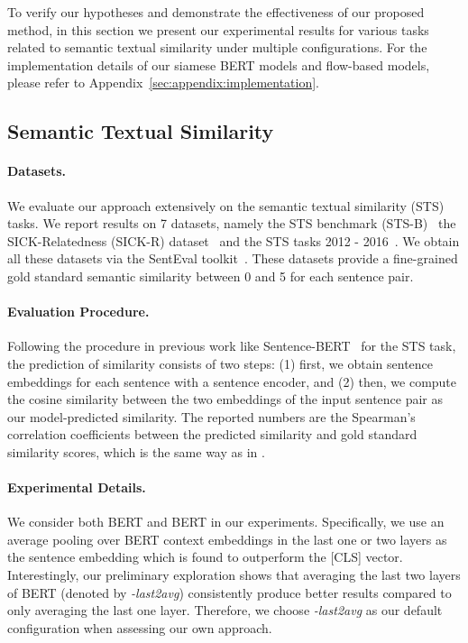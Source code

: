 \documentclass[11pt,a4paper]{article}
\begin{document}
To verify our hypotheses and demonstrate the effectiveness of our proposed method, in this section we present our experimental results for various tasks related to semantic textual similarity under multiple configurations. For the implementation details of our siamese BERT models and flow-based models, please refer to Appendix~\ref{sec:appendix:implementation}.



\subsection{Semantic Textual Similarity}

\paragraph{Datasets.}
We evaluate our approach extensively on the semantic textual similarity (STS) tasks. We report results on 7 datasets, namely the STS benchmark (STS-B)~\citep{cer2017semeval}
the SICK-Relatedness (SICK-R) dataset~\citep{marelli2014sick} and the
STS tasks 2012 - 2016~\citep{agirre2012semeval,agirre2013sem,agirre2014semeval,agirre2015semeval,agirre2016semeval}. We obtain all these datasets via the SentEval toolkit~\citep{conneau2018senteval}. These datasets provide a fine-grained gold standard semantic similarity between 0 and 5 for each sentence pair.



\paragraph{Evaluation Procedure. }
Following the procedure in previous work like Sentence-BERT~\cite{reimers2019sentence} for the STS task, the prediction of similarity consists of two steps: (1) first, we obtain sentence embeddings for each sentence with a sentence encoder, and  
(2) then, we compute the cosine similarity between the two embeddings of the input sentence pair as our model-predicted similarity. The reported numbers are the Spearman's correlation coefficients between the predicted similarity and gold standard similarity scores, which is the same way as in \citep{reimers2019sentence}. 


\paragraph{Experimental Details. }
We consider both BERT and BERT in our experiments. Specifically, we use an average pooling over BERT context embeddings in the last one or two layers as the sentence embedding which is found to outperform the [CLS] vector. Interestingly, our preliminary exploration shows that averaging the last two layers of BERT (denoted by \textit{-last2avg}) consistently produce better results compared to only averaging the last one layer. Therefore, we choose \textit{-last2avg} as our default configuration when assessing our own approach.
\end{document}
